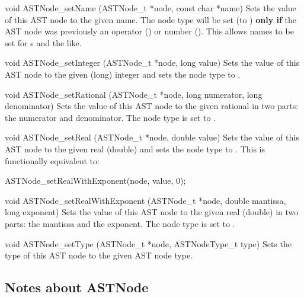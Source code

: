 \documentclass{sbmlmanual}
\begin{document}
\begin{methoddef}{void ASTNode\_setName (ASTNode\_t *node, const char *name)}
  Sets the value of this AST node to the given name.
  The node type will be set (to ) \textbf{only if} the AST
  node was previously an operator () or
  number ().  This allows names to be set for
  s and the like.
\end{methoddef}


\begin{methoddef}{void ASTNode\_setInteger (ASTNode\_t *node, long value)}
  Sets the value of this AST node to the given (long) integer and sets the
  node type to .
\end{methoddef}


\begin{methoddef}{void ASTNode\_setRational (ASTNode\_t *node, long numerator, long denominator)}
  Sets the value of this AST node to the given rational in two parts:
  the numerator and denominator.  The node type is set to .
\end{methoddef}


\begin{methoddef}{void ASTNode\_setReal (ASTNode\_t *node, double value)}
  Sets the value of this AST node to the given real (double) and sets the
  node type to .  This is functionally equivalent to:
  \begin{example}[c]
    ASTNode_setRealWithExponent(node, value, 0);
  \end{example}
\end{methoddef}


\begin{methoddef}{void ASTNode\_setRealWithExponent (ASTNode\_t *node, double mantissa, long exponent)}
  Sets the value of this AST node to the given real (double) in two parts:
  the mantissa and the exponent.  The node type is set to
  .
\end{methoddef}


\begin{methoddef}{void ASTNode\_setType (ASTNode\_t *node, ASTNodeType\_t type)}
  Sets the type of this AST node to the given AST node type.
\end{methoddef}


\subsection{Notes about ASTNode}
\end{document}
